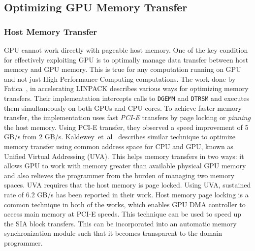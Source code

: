 \subsection{Optimizing GPU Memory Transfer}
\subsubsection{Host Memory Transfer}
GPU cannot work directly with pageable host memory. One of the key condition for
effectively exploiting GPU is to optimally manage data transfer between host memory
and GPU memory. This is true for any computation running on GPU and not just High
Performance Computing computations. The work done by Fatica~\cite{Fatica:2009:ALC:1513895.1513901},
in accelerating LINPACK describes various ways for optimizing memory transfers. Their
implementation intercepts calls to \texttt{DGEMM} and \texttt{DTRSM} and executes them simultaneously
on both GPUs and CPU cores. To achieve faster memory transfer, the implementation uses fast
\textit{PCI-E} transfers by page locking or \textit{pinning} the host memory. Using
PCI-E transfer, they observed a speed improvement of 5 GB/s from 2 GB/s.
Kaldewey~et~al~\cite{Kaldewey:2012:GJP:2236584.2236592} describes similar technique
to optimize memory transfer using common address space for CPU and GPU, known as
Unified Virtual Addressing (UVA). This helps memory transfers in two ways: it
allows GPU to work with memory greater than available physical GPU memory and also relieves
the programmer from the burden of managing two memory spaces. UVA requires that the
host memory is page locked. Using UVA, sustained rate of 6.2 GB/s has been reported in their work.
Host memory page locking is a common technique in both of the works, which enables GPU DMA controller
to access main memory at PCI-E speeds. This technique can be used to speed up the
SIA block transfers. This can be incorporated into an automatic memory synchronization module
such that it becomes transparent to the domain programmer.

